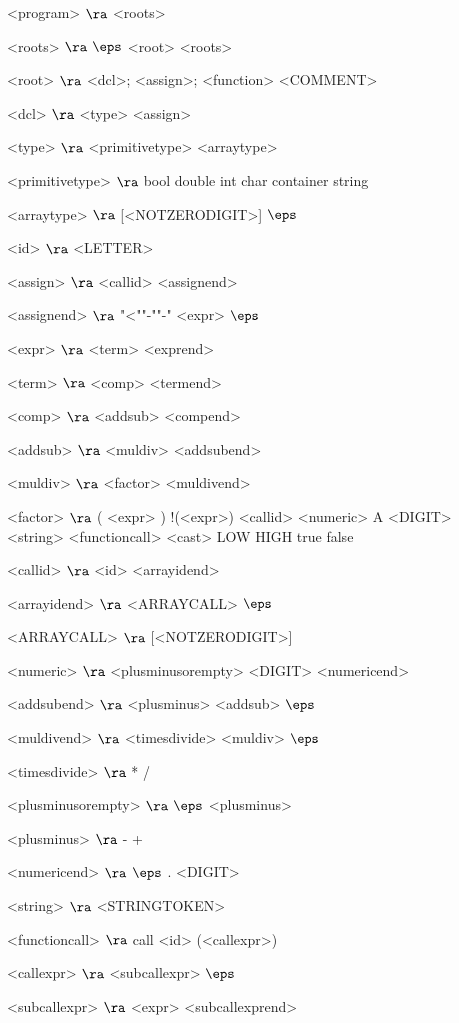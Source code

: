 \begin{grammar}
<program> $\ra$ <roots>

<roots> $\ra$ $\eps$
\alt <root> <roots>
 
<root> $\ra$ <dcl>;
\alt <assign>;
\alt <function>
\alt <COMMENT>

<dcl> $\ra$ <type> <assign>

<type> $\ra$ <primitivetype> <arraytype>

<primitivetype> $\ra$ bool
\alt double
\alt int
\alt char
\alt container
\alt string

<arraytype> $\ra$ [<NOTZERODIGIT>]
\alt$\eps$

<id> $\ra$ <LETTER>

<assign> $\ra$ <callid> <assignend>

<assignend> $\ra$ "<""-""-" <expr>
\alt $\eps$

<expr> $\ra$ <term> <exprend>

<term> $\ra$ <comp> <termend>

<comp> $\ra$ <addsub> <compend>

<addsub> $\ra$ <muldiv> <addsubend>

<muldiv> $\ra$ <factor> <muldivend>

<factor> $\ra$ ( <expr> )
	\alt !(<expr>)
	\alt <callid>
	\alt <numeric>
	\alt A  <DIGIT>
	\alt <string>
	\alt <functioncall> 
	\alt <cast>
	\alt LOW
	\alt HIGH
	\alt true
	\alt false

<callid> $\ra$ <id> <arrayidend>

<arrayidend> $\ra$ <ARRAYCALL>
\alt $\eps$

<ARRAYCALL> $\ra$ [<NOTZERODIGIT>]

<numeric> $\ra$ <plusminusorempty> <DIGIT> <numericend>

<addsubend> $\ra$ <plusminus> <addsub>
\alt $\eps$

<muldivend> $\ra$ <timesdivide> <muldiv>
\alt $\eps$

<timesdivide> $\ra$ *
\alt /

<plusminusorempty> $\ra$ $\eps$
\alt <plusminus>

<plusminus> $\ra$ -
\alt +

<numericend> $\ra$ $\eps$
\alt . <DIGIT>

<string> $\ra$ <STRINGTOKEN>

<functioncall> $\ra$ call <id> (<callexpr>)

<callexpr> $\ra$ <subcallexpr>
\alt$\eps$

<subcallexpr> $\ra$ <expr> <subcallexprend>


\end{grammar}
